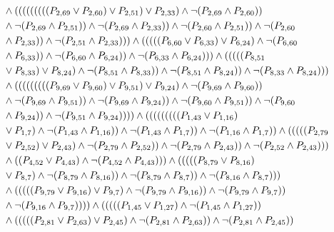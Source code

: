 \documentclass[10pt]{article}
\begin{document}
\begin{align*}
& \land (((((((((\PV{2,69} \lor \PV{2,60}) \lor \PV{2,51}) \lor \PV{2,33}) \land \lnot(\PV{2,69} \land \PV{2,60})) \\
& \land \lnot(\PV{2,69} \land \PV{2,51})) \land \lnot(\PV{2,69} \land \PV{2,33})) \land \lnot(\PV{2,60} \land \PV{2,51})) \land \lnot(\PV{2,60} \\
& \land \PV{2,33})) \land \lnot(\PV{2,51} \land \PV{2,33}))) \land (((((\PV{6,60} \lor \PV{6,33}) \lor \PV{6,24}) \land \lnot(\PV{6,60} \\
& \land \PV{6,33})) \land \lnot(\PV{6,60} \land \PV{6,24})) \land \lnot(\PV{6,33} \land \PV{6,24}))) \land (((((\PV{8,51} \\
& \lor \PV{8,33}) \lor \PV{8,24}) \land \lnot(\PV{8,51} \land \PV{8,33})) \land \lnot(\PV{8,51} \land \PV{8,24})) \land \lnot(\PV{8,33} \land \PV{8,24}))) \\
& \land (((((((((\PV{9,69} \lor \PV{9,60}) \lor \PV{9,51}) \lor \PV{9,24}) \land \lnot(\PV{9,69} \land \PV{9,60})) \\
& \land \lnot(\PV{9,69} \land \PV{9,51})) \land \lnot(\PV{9,69} \land \PV{9,24})) \land \lnot(\PV{9,60} \land \PV{9,51})) \land \lnot(\PV{9,60} \\
& \land \PV{9,24})) \land \lnot(\PV{9,51} \land \PV{9,24})))) \land (((((((((\PV{1,43} \lor \PV{1,16}) \\
& \lor \PV{1,7}) \land \lnot(\PV{1,43} \land \PV{1,16})) \land \lnot(\PV{1,43} \land \PV{1,7})) \land \lnot(\PV{1,16} \land \PV{1,7})) \land (((((\PV{2,79} \\
& \lor \PV{2,52}) \lor \PV{2,43}) \land \lnot(\PV{2,79} \land \PV{2,52})) \land \lnot(\PV{2,79} \land \PV{2,43})) \land \lnot(\PV{2,52} \land \PV{2,43}))) \\
& \land ((\PV{4,52} \lor \PV{4,43}) \land \lnot(\PV{4,52} \land \PV{4,43}))) \land (((((\PV{8,79} \lor \PV{8,16}) \\
& \lor \PV{8,7}) \land \lnot(\PV{8,79} \land \PV{8,16})) \land \lnot(\PV{8,79} \land \PV{8,7})) \land \lnot(\PV{8,16} \land \PV{8,7}))) \\
& \land (((((\PV{9,79} \lor \PV{9,16}) \lor \PV{9,7}) \land \lnot(\PV{9,79} \land \PV{9,16})) \land \lnot(\PV{9,79} \land \PV{9,7})) \\
& \land \lnot(\PV{9,16} \land \PV{9,7})))) \land (((((\PV{1,45} \lor \PV{1,27}) \land \lnot(\PV{1,45} \land \PV{1,27})) \\
& \land (((((\PV{2,81} \lor \PV{2,63}) \lor \PV{2,45}) \land \lnot(\PV{2,81} \land \PV{2,63})) \land \lnot(\PV{2,81} \land \PV{2,45})) \\

\end{align*}
\end{document}
